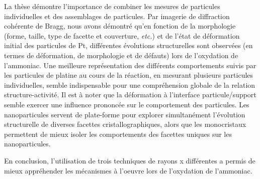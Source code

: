 La thèse démontre l’importance de combiner les mesures de particules individuelles et des assemblages de particules.
Par imagerie de diffraction cohérente de Bragg, nous avons démontré qu'en fonction de la morphologie (forme, taille, type de facette et couverture, \textit{etc.}) et de l'état de déformation initial des particules de Pt, différentes évolutions structurelles sont observées (en termes de déformation, de morphologie et de défauts) lors de l'oxydation de l'ammoniac.
Une meilleure représentation des différents comportements suivis par les particules de platine au cours de la réaction, en mesurant plusieurs particules individuelles, semble indispensable pour une compréhension globale de la relation structure-activité.
Il est à noter que la déformation à l’interface particule/support semble exercer une influence prononcée sur le comportement des particules.
Les nanoparticules servent de plate-forme pour explorer simultanément l’évolution structurelle de diverses facettes cristallographiques, alors que les monocristaux permettent de mieux isoler les comportements des facettes uniques sur les nanoparticules.

En conclusion, l'utilisation de trois techniques de rayons x différentes a permis de mieux appréhender les mécanismes à l'oeuvre lors de l'oxydation de l'ammoniac.

\vspace{\fill} %

\newpage\thispagestyle{empty}\null\newpage